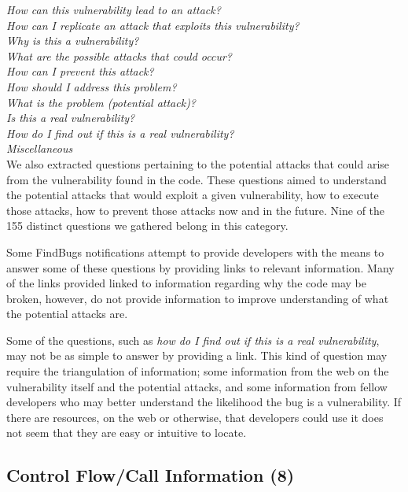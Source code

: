 \documentclass[conference]{IEEEtran}
\begin{document}
\noindent\emph{How can this vulnerability lead to an attack?} \\
\emph{How can I replicate an attack that exploits this vulnerability?} \\
\emph{Why is this a vulnerability?} \\
\emph{What are the possible attacks that could occur?} \\
\emph{How can I prevent this attack?} \\
\emph{How should I address this problem? } \\
\emph{What is the problem (potential attack)?} \\
\emph{Is this a real vulnerability?} \\
\emph{How do I find out if this is a real vulnerability?} \\
\emph{Miscellaneous} \\

We also extracted questions pertaining to the potential attacks that could arise from the vulnerability found in the code. 
These questions aimed to understand the potential attacks that would exploit a given vulnerability, how to execute those attacks, how to prevent those attacks now and in the future. 
Nine of the 155 distinct questions we gathered belong in this category.

Some FindBugs notifications attempt to provide developers with the means to answer some of these questions by providing links to relevant information. 
Many of the links provided linked to information regarding why the code may be broken, however, do not provide information to improve understanding of what the potential attacks are.  

Some of the questions, such as \textit{how do I find out if this is a real vulnerability}, may not be as simple to answer by providing a link. 
This kind of question may require the triangulation of information; some information from the web on the vulnerability itself and the potential attacks, and some information from fellow developers who may better understand the likelihood the bug is a vulnerability. 
If there are resources, on the web or otherwise, that developers could use it does not seem that they are easy or intuitive to locate.



\noindent\subsection{\textbf{Control Flow/Call Information (8)}}
\end{document}
